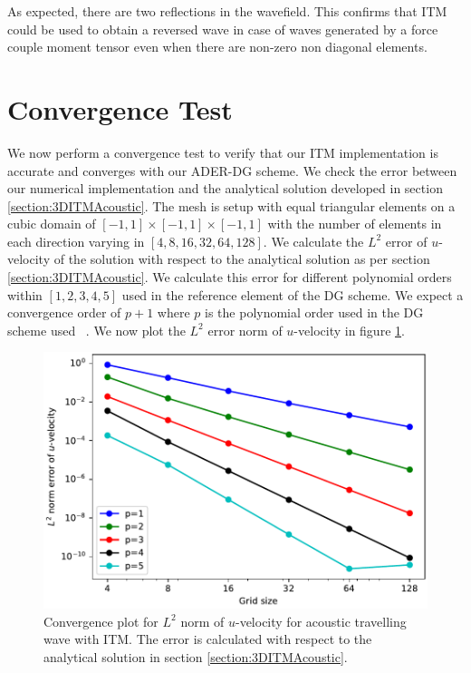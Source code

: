 As expected, there are two reflections in the wavefield. This confirms that \ac{ITM} could be used to obtain a reversed wave in case of waves generated by a force couple moment tensor even when there are non-zero non diagonal elements.
\section{Convergence Test}\label{sec:convergence}
We now perform a convergence test to verify that our \ac{ITM} implementation is accurate and converges with our \ac{ADER}-\ac{DG} scheme. 
We check the error between our numerical implementation and the analytical solution developed in section \ref{section:3DITMAcoustic}. 
The mesh is setup with equal triangular elements on a cubic domain of $\left[-1, 1\right] \times \left[-1, 1\right] \times \left[-1, 1\right]$ with the number of elements in each direction varying in $\left[4, 8, 16, 32, 64, 128\right]$.
We calculate the $L^2$ error of $u$-velocity of the solution with respect to the analytical solution as per section \ref{section:3DITMAcoustic}. We calculate this error for different polynomial
orders within $\left[1, 2, 3, 4, 5\right]$ used in the reference element of the \ac{DG} scheme. We expect a convergence order of $p+1$ where $p$ is the polynomial order used in the
\ac{DG} scheme used ~\parencite{cockburn2011discontinuous}. We now plot the $L^2$ error norm of $u$-velocity in figure \ref{fig:convergence}.

\begin{figure}[htpb]
    \centering
    \includegraphics[width=0.8\linewidth]{figures/error1.pdf}
    \caption{Convergence plot for $L^2$ norm of $u$-velocity for acoustic travelling wave with \ac{ITM}. The error is calculated with respect to the analytical solution
    in section \ref{section:3DITMAcoustic}.}
    \label{fig:convergence}
\end{figure}

